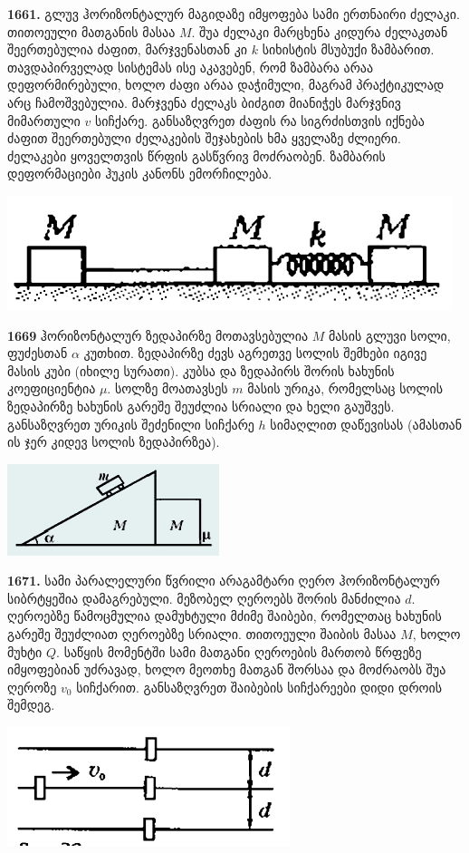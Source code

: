 \documentclass[12pt,a4paper,]{report}
\begin{document}
\textbf{1661.} გლუვ ჰორიზონტალურ მაგიდაზე იმყოფება სამი ერთნაირი ძელაკი. თითოეული მათგანის მასაა $M$. შუა ძელაკი მარცხენა კიდურა ძელაკთან შეერთებულია ძაფით, მარჯვენასთან კი $k$ სიხისტის მსუბუქი ზამბარით. თავდაპირველად სისტემას ისე აკავებენ, რომ ზამბარა არაა დეფორმირებული, ხოლო ძაფი არაა დაჭიმული, მაგრამ პრაქტიკულად არც ჩამოშვებულია. მარჯვენა ძელაკს ბიძგით მიანიჭეს მარჯვნივ მიმართული $v$ სიჩქარე. განსაზღვრეთ ძაფის რა სიგრძისთვის იქნება ძაფით შეერთებული ძელაკების შეჯახების ხმა ყველაზე ძლიერი. ძელაკები ყოველთვის წრფის გასწვრივ მოძრაობენ. ზამბარის დეფორმაციები ჰუკის კანონს ემორჩილება.
		\begin{center}
			\includegraphics[scale=0.5]{images/F1661.png}
		\end{center}

\textbf{1669} ჰორიზონტალურ ზედაპირზე მოთავსებულია $M$ მასის გლუვი სოლი, ფუძესთან $\alpha$ კუთხით. ზედაპირზე ძევს აგრეთვე სოლის შემხები იგივე მასის კუბი (იხილე სურათი). კუბსა და ზედაპირს შორის ხახუნის კოეფიციენტია $\mu$. სოლზე მოათავსეს $m$ მასის ურიკა, რომელსაც სოლის ზედაპირზე ხახუნის გარეშე შეუძლია სრიალი და ხელი გაუშვეს. განსაზღვრეთ ურიკის შეძენილი სიჩქარე $h$ სიმაღლით დაწევისას (ამასთან ის ჯერ კიდევ სოლის ზედაპირზეა).
		\begin{center}
			\includegraphics[scale=0.5]{images/F1669}
		\end{center}

\textbf{1671.} სამი პარალელური წვრილი არაგამტარი ღერო ჰორიზონტალურ სიბრტყეშია დამაგრებული. მეზობელ ღეროებს შორის მანძილია $d$. ღეროებზე წამოცმულია დამუხტული მძიმე შაიბები, რომელთაც ხახუნის გარეშე შეუძლიათ ღეროებზე სრიალი. თითოეული შაიბის მასაა $M$, ხოლო მუხტი $Q$. საწყის მომენტში სამი მათგანი ღეროების მართობ წრფეზე იმყოფებიან უძრავად, ხოლო მეოთხე მათგან შორსაა და მოძრაობს შუა ღეროზე $v_0$ სიჩქარით. განსაზღვრეთ შაიბების სიჩქარეები დიდი დროის შემდეგ. 
		\begin{center}
			\includegraphics[scale=0.5]{images/F1671}
		\end{center}
\end{document}
